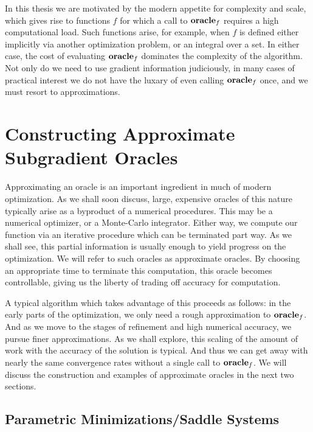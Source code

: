 In this thesis we are motivated by the modern appetite for complexity and
scale, which gives rise to functions $f$ for which a call to $\mbox{\bf oracle}_f$
requires a high computational load. Such functions arise, for example, when
$f$ is defined either implicitly via another optimization problem, or an
integral over a set. In either case, the cost of evaluating $\mbox{\bf oracle}_f$
dominates the complexity of the algorithm. Not only do we need to use gradient
information judiciously, in many cases of practical interest we do not have
the luxary of even calling $\mbox{\bf oracle}_f$ once, and we must resort to
approximations.

\section{Constructing Approximate Subgradient Oracles}

Approximating an oracle is an important ingredient in much of modern
optimization. As we shall soon discuss, large, expensive oracles of this
nature typically arise as a byproduct of a numerical procedures. This may be a
numerical optimizer, or a Monte-Carlo integrator. Either way, we compute our
function via an iterative procedure which can be terminated part way. As we
shall see, this partial information is usually enough to yield progress on the
optimization. We will refer to such oracles as approximate oracles. By
choosing an appropriate time to terminate this computation, this oracle
becomes controllable, giving us the liberty of trading off accuracy for
computation.

A typical algorithm which takes advantage of this proceeds as follows: in the
early parts of the optimization, we only need a rough approximation to
$\mbox{\bf oracle}_f$. And as we move to the stages of refinement and high
numerical accuracy, we pursue finer approximations. As we shall explore, this
scaling of the amount of work with the accuracy of the solution is typical.
And thus we can get away with nearly the same convergence rates without a
single call to $\mbox{\bf oracle}_f$. We will discuss the construction and examples
of approximate oracles in the next two sections.

\subsection{Parametric Minimizations/Saddle Systems} 

